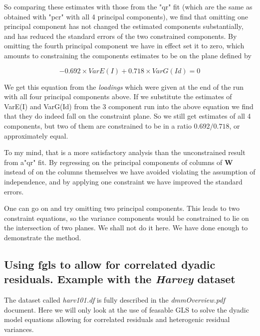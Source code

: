 \documentclass[titlepage,a4paper,12pt]{article}  %
\begin{document}
So comparing these estimates with those from the "qr" fit (which are the same as obtained with "pcr" with all 4 principal components), we find that omitting one principal component has not changed the estimated components substantially, and has reduced the standard errors of the two constrained components.  By omitting the fourth principal component we have in effect set it to zero, which amounts to constraining the components estimates to be on the plane defined by

\begin{equation}
  -0.692 \times VarE(I) + 0.718 \times VarG(Id) = 0
\end{equation}

We get this equation from the {\em loadings} which were given at the end of the run with all four principal components above. If we substitute the estimates of VarE(I) and VarG(Id) from the 3 component run into the above equation we find that they do indeed fall on the constraint plane. So we still get estimates of all 4 components, but two of them are constrained to be in a ratio $0.692/0.718$, or approximately equal. 

To my mind, that is a more satisfactory analysis than the unconstrained result from  a"qr" fit. By regressing on the principal components of columns of $\bm{W}$ instead of on the columns themselves we have avoided violating the assumption of independence, and by applying one constraint we have improved the standard errors.

One can go on and try omitting two principal components. This leads to two constraint equations, so the variance components would be constrained to lie on the intersection of two planes. We shall not do it here. We have done enough to demonstrate the method.


\subsection{Using fgls to allow for correlated dyadic residuals. Example with the {\em Harvey} dataset}
The dataset called {\em harv101.df} is fully described in the {\em dmmOverview.pdf}~\cite{jack:15} document. 
Here we will only look at the use of feasable GLS to solve the dyadic model equations allowing for correlated residuals and heterogenic residual variances. 
\end{document}
